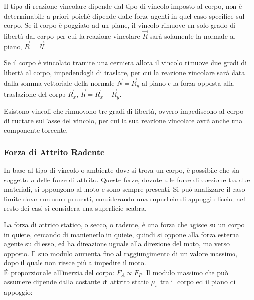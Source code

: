 \documentclass{article}
\numberwithin{equation}{subsection}
\begin{document}
\begin{center}\end{center}
    
Il tipo di reazione vincolare dipende dal tipo di vincolo imposto al corpo, non è determinabile a priori poiché dipende dalle forze agenti in quel caso specifico sul 
corpo. Se il corpo è poggiato ad un piano, il vincolo rimuove un solo grado di libertà dal corpo per 
cui la reazione vincolare $\vec{R}$ sarà solamente la normale al piano, $\vec{R}=\vec{N}$.  


Se il corpo è vincolato tramite una cerniera allora il vincolo rimuove due gradi di libertà al corpo, impedendogli di traslare, per cui la reazione vincolare sarà data 
dalla somma vettoriale della normale $\vec{N}=\vec{R}_y$ al piano e la forza opposta alla traslazione del corpo $\vec{R}_x$, $\vec{R}=\vec{R}_x+\vec{R}_y$.


Esistono vincoli che rimuovono tre gradi di libertà, ovvero impediscono al corpo di ruotare sull'asse del vincolo, per cui la sua reazione vincolare avrà anche una componente 
torcente. 

\subsubsection{Forza di Attrito Radente}
In base al tipo di vincolo o ambiente dove si trova un corpo, è possibile che sia soggetto a delle forze di attrito. Queste forze, dovute alle forze di coesione tra due 
materiali, si oppongono al moto e sono sempre presenti. Si può analizzare il caso limite dove non sono presenti, considerando una superficie di appoggio liscia, nel resto 
dei casi si considera una superficie scabra.




La forza di attrico statico, o secco, o radente, è una forza 
che agisce su un corpo in quiete, cercando di mantenerlo in 
quiete, quindi si oppone alla forza esterna agente su di esso, 
ed ha direazione uguale alla direzione del moto, ma verso 
opposto. Il suo modulo aumenta fino al raggiungimento di 
un valore massimo, dopo il quale non riesce più a impedire 
il moto.\\
\'{E} proporzionale all'inerzia del corpo: $F_A\propto F_P$. Il 
modulo massimo che può assumere dipende dalla costante di attrito 
statio $\mu_s$ tra il corpo ed il piano di appoggio:
\end{document}
